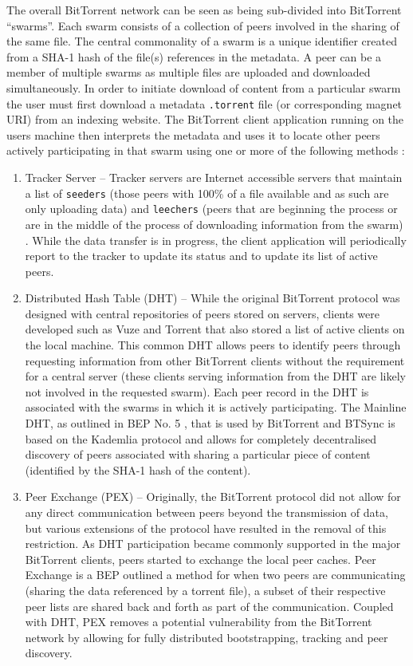 \documentclass[final,5p,times,twocolumn]{elsarticle}
\begin{document}
The overall BitTorrent network can be seen as being sub-divided into BitTorrent ``swarms''. Each swarm consists of a collection of peers involved in the sharing of the same file. The central commonality of a swarm is a unique identifier created from a SHA-1 hash of the file(s) references in the metadata. A peer can be a member of multiple swarms as multiple files are uploaded and downloaded simultaneously. In order to initiate download of content from a particular swarm the user must first download a metadata \texttt{.torrent} file (or corresponding magnet URI) from an indexing website. The BitTorrent client application running on the users machine then interprets the metadata and uses it to locate other peers actively participating in that swarm using one or more of the following methods \cite{scanlon2010week}: 


\begin{enumerate}
\item Tracker Server -- Tracker servers are Internet accessible servers that maintain a list of \texttt{seeders} (those peers with 100\% of a file available and as such are only uploading data) and \texttt{leechers} (peers that are beginning the process or are in the middle of the process of downloading information from the swarm) \cite{cohen2003incentives}. While the data transfer is in progress, the client application will periodically report to the tracker to update its status and to update its list of active peers.
\item Distributed Hash Table (DHT) -- While the original BitTorrent protocol was designed with central repositories of peers stored on servers, clients were developed such as Vuze and Torrent that also stored a list of active clients on the local machine. This common DHT allows peers to identify peers through requesting information from other BitTorrent clients without the requirement for a central server (these clients serving information from the DHT are likely not involved in the requested swarm). Each peer record in the DHT is associated with the swarms in which it is actively participating. The Mainline DHT, as outlined in BEP No. 5 \cite{cohen2008bittorrent}, that is used by BitTorrent and BTSync is based on the Kademlia protocol and allows for completely decentralised discovery of peers associated with sharing a particular piece of content (identified by the SHA-1 hash of the content).
\item Peer Exchange (PEX) -- Originally, the BitTorrent protocol did not allow for any direct communication between peers beyond the transmission of data, but various extensions of the protocol have resulted in the removal of this restriction. As DHT participation became commonly supported in the major BitTorrent clients, peers started to exchange the local peer caches. Peer Exchange is a BEP outlined a method for when two peers are communicating (sharing the data referenced by a torrent file), a subset of their respective peer lists are shared back and forth as part of the communication. Coupled with DHT, PEX removes a potential vulnerability from the BitTorrent network by allowing for fully distributed bootstrapping, tracking and peer discovery. 
\end{enumerate}
\end{document}
